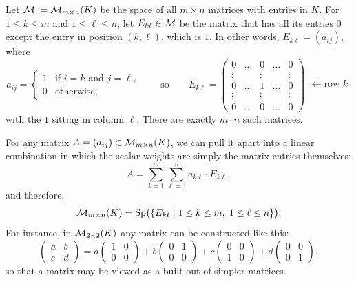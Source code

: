 \begin{example}
\label{ex:span_matrix_space}
Let $\mathcal{M} := \mathcal{M}_{m \times n}(K)$ be the space of all $m \times n$ matrices with entries in $K$. For $1 \le k \le m$ and $1 \le \ell \le n$, let $E_{k\ell} \in \mathcal{M}$ be the matrix that has all its entries $0$ except the entry in position $(k, \ell)$, which is $1$. In other words, $E_{k\ell} = (a_{ij})$, where
\[
a_{ij} =
\begin{cases}
1 & \text{if } i = k \text{ and } j = \ell, \\
0 & \text{otherwise,}
\end{cases}
\qquad \text{so} \qquad
E_{k\ell} =
\begin{pmatrix}
0 & \dots & 0 & \dots & 0 \\
\vdots & & \vdots & & \vdots \\
0 & \dots & 1 & \dots & 0 \\
\vdots & & \vdots & & \vdots \\
0 & \dots & 0 & \dots & 0
\end{pmatrix}
\begin{matrix} \\ \\ \leftarrow \text{row } k \\ \\ \\ \end{matrix}
\]
with the $1$ sitting in column $\ell$. There are exactly $m \cdot n$ such matrices.

For any matrix $A = (a_{ij}) \in \mathcal{M}_{m \times n}(K)$, we can pull it apart into a linear combination in which the scalar weights are simply the matrix entries themselves:
\[
A = \sum_{k=1}^m \sum_{\ell=1}^n a_{k\ell} \cdot E_{k\ell},
\]
and therefore,
\[
\mathcal{M}_{m \times n}(K) = \operatorname{Sp}\bigl(\{E_{k\ell} \mid 1 \le k \le m, \; 1 \le \ell \le n\}\bigr).
\]
For instance, in $\mathcal{M}_{2 \times 2}(K)$ any matrix can be constructed like this:
\[
\begin{pmatrix} a & b \\ c & d \end{pmatrix} = a \begin{pmatrix} 1 & 0 \\ 0 & 0 \end{pmatrix} + b \begin{pmatrix} 0 & 1 \\ 0 & 0 \end{pmatrix} + c \begin{pmatrix} 0 & 0 \\ 1 & 0 \end{pmatrix} + d \begin{pmatrix} 0 & 0 \\ 0 & 1 \end{pmatrix},
\]
so that a matrix may be viewed as a  built out of simpler matrices.
\end{example}

